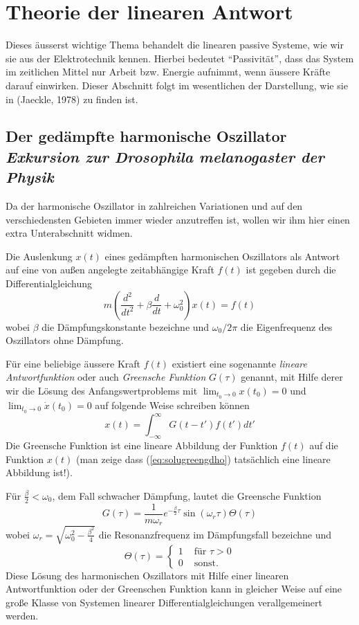 \chapter{Theorie der linearen Antwort}
Dieses äusserst wichtige Thema behandelt die linearen passive Systeme, wie wir
sie aus der Elektrotechnik kennen. Hierbei bedeutet ``Passivität'', dass das
System im zeitlichen Mittel nur Arbeit bzw. Energie aufnimmt, wenn äussere
Kräfte darauf einwirken. Dieser Abschnitt folgt im wesentlichen der
Darstellung, wie sie in (Jaeckle, 1978) zu finden ist.
\section{Der gedämpfte harmonische Oszillator\\ 
\it Exkursion zur Drosophila melanogaster der Physik}\label{sec:gho}
Da der harmonische Oszillator in zahlreichen Variationen und auf den
verschiedensten Gebieten immer wieder anzutreffen ist, wollen wir ihm hier
einen extra Unterabschnitt widmen. 

Die Auslenkung $x(t)$ eines gedämpften harmonischen Oszillators als Antwort
auf eine von außen angelegte zeitabhängige Kraft $f(t)$ ist gegeben durch
die Differentialgleichung
\begin{equation}
  m\left(\frac{d^2}{dt^2}+\beta\frac{d}{dt}+\omega_0^2\right)x(t)=f(t)  
  \label{eq:gdho}
\end{equation}
wobei $\beta$ die Dämpfungskonstante bezeichne und $\omega_0/2\pi$ die
Eigenfrequenz des Oszillators ohne Dämpfung.

Für eine beliebige äussere Kraft $f(t)$ existiert eine sogenannte {\it
lineare Antwortfunktion} oder auch {\it Greensche Funktion} $G(\tau)$ genannt,
mit Hilfe derer wir die Lösung des Anfangswertproblems mit
$\lim_{t_0\rightarrow 0}x(t_0)=0$ und $\lim_{t_0\rightarrow 0}\dot{x}(t_0)=0$
auf folgende Weise schreiben können
\begin{equation}
  x(t)=\int_{-\infty}^{\infty}G(t-t')f(t')dt'
  \label{eq:solugreengdho}
\end{equation}
Die Greensche Funktion ist eine lineare Abbildung der Funktion $f(t)$ auf die
Funktion $x(t)$ (man zeige dass (\ref{eq:solugreengdho}) tatsächlich eine
lineare Abbildung ist!).

Für $\frac{\beta}{2}<\omega_0$, dem Fall schwacher Dämpfung, lautet die
Greensche Funktion 
\begin{equation}
  G(\tau)=\frac{1}{m\omega_r}e^{-\frac{\beta}{2}\tau}\sin(\omega_r\tau)\Theta(\tau)
  \label{eq:Greenfunction}
\end{equation}
wobei $\omega_r=\sqrt{\omega_0^2-\frac{\beta^2}{4}}$ die Resonanzfrequenz im
Dämpfungsfall bezeichne und 
\begin{equation*}
  \Theta(\tau)=\left\{\begin{array}{cc}1&\mbox{ für }\tau>0\\0&\mbox{ sonst. }\end{array}\right.
\end{equation*}
Diese Lösung des harmonischen Oszillators mit Hilfe einer linearen
Antwortfunktion oder der Greenschen Funktion kann in gleicher Weise auf eine
gro{\ss}e Klasse von Systemen linearer Differentialgleichungen verallgemeinert
werden.

